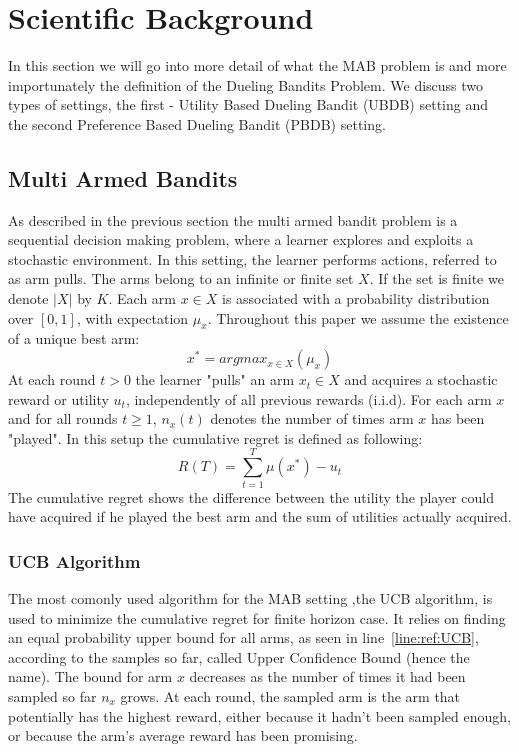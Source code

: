 \documentclass{llncs}
\begin{document}
\section{Scientific Background}
	In this section we will go into more detail of what the MAB problem is and more importunately the definition of the Dueling Bandits Problem. 
	We discuss two types of settings, the first - Utility Based Dueling Bandit (UBDB) setting and the second Preference Based Dueling Bandit (PBDB) setting.
	\subsection{Multi Armed Bandits}
	As described in the previous section the multi armed bandit problem is a sequential decision making problem, where a learner explores and exploits a stochastic environment. 
	In this setting, the learner performs actions, referred to as arm pulls. 
	The arms belong to an infinite or finite set $X$. 
	If the set is finite we denote $|X|$ by $K$. 
	Each arm $x \in X$ is associated with a probability distribution over $[0, 1]$, with expectation $\mu_{x}$. 
	Throughout this paper we assume the existence of a unique best arm:
	\begin{equation}\label{eq:regret}
		x^* = argmax_{x \in X}(\mu_{x})
	\end{equation}		
	At each round $t > 0$ the learner "pulls" an arm $x_t \in X$ and acquires a stochastic reward or utility $u_t$, independently of all previous rewards (i.i.d). 
	For each arm $x$ and for all rounds $t \geq 1$,  $n_{x}(t)$ denotes the number of times arm $x$ has been "played".
	In this setup the cumulative regret is defined as following:
	\begin{equation}\label{eq:regret}
		R(T) = \sum_{t=1}^{T} \mu(x^*) - u_t
	\end{equation}
	The cumulative regret shows the difference between the utility the player could have acquired if he played the best arm and the sum of utilities actually acquired.
	
	\subsubsection{UCB Algorithm}	
	The most comonly used algorithm for the MAB setting ,the UCB algorithm, is used to minimize the cumulative regret for finite horizon case. 
	It relies on finding an equal probability upper bound for all arms, as seen in line~\ref{line:ref:UCB}, according to the samples so far, called Upper Confidence Bound (hence the name). 
	The bound for arm $x$ decreases as the number of times it had been sampled so far $n_x$ grows.
	At each round, the sampled arm is the arm that potentially has the highest reward, either because it hadn’t been sampled enough, or because the arm’s average reward has been promising.
	
\end{document}
